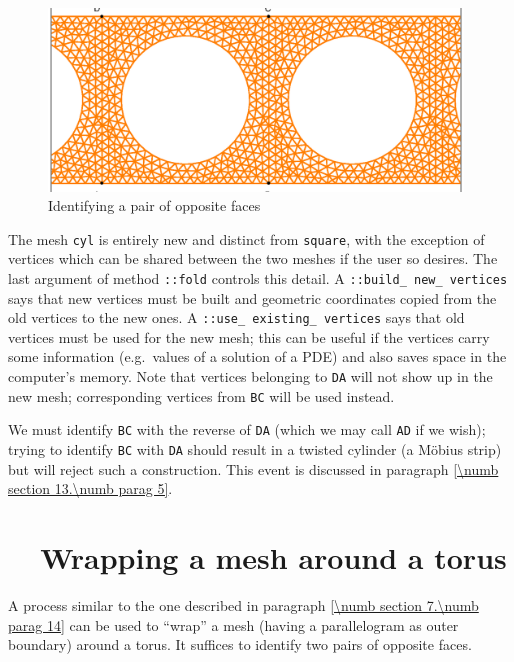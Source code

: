 \begin{figure}[ht] \centering
  \includegraphics[width=110mm]{cylinder-1.eps}
  \caption{Identifying a pair of opposite faces}
  \label{\numb section 7.\numb fig 10}
\end{figure}

The mesh {\small\tt cyl} is entirely new and distinct from {\small\tt square},
with the exception of vertices which can be shared between the two meshes if the
user so desires.
The last argument of method {\small\tt{}::fold} controls this detail.
A {\small\tt{}::build\_\,new\_\,vertices} says that new vertices must be built
and geometric coordinates copied from the old vertices to the new ones.
A {\small\tt{}::use\_\,existing\_\,vertices} says that old vertices must be used
for the new mesh; this can be useful if the vertices carry some information
(e.g.\ values of a solution of a PDE) and also saves space in the computer's memory.
Note that vertices belonging to {\small\tt DA} will not show up in the
new mesh; corresponding vertices from {\small\tt BC} will be used instead.

We must identify {\small\tt BC} with the reverse of {\small\tt DA} (which we may call
{\small\tt AD} if we wish); trying to identify {\small\tt BC} with {\small\tt DA} should
result in a twisted cylinder (a M\"obius strip) but {\maniFEM} will reject such a construction.
This event is discussed in paragraph \ref{\numb section 13.\numb parag 5}.


\section{~~Wrapping a mesh around a torus}\label{\numb section 7.\numb parag 15}

A process similar to the one described in paragraph \ref{\numb section 7.\numb parag 14}
can be used to ``wrap'' a mesh (having a parallelogram as outer boundary) around
a torus.
It suffices to identify two pairs of opposite faces.


